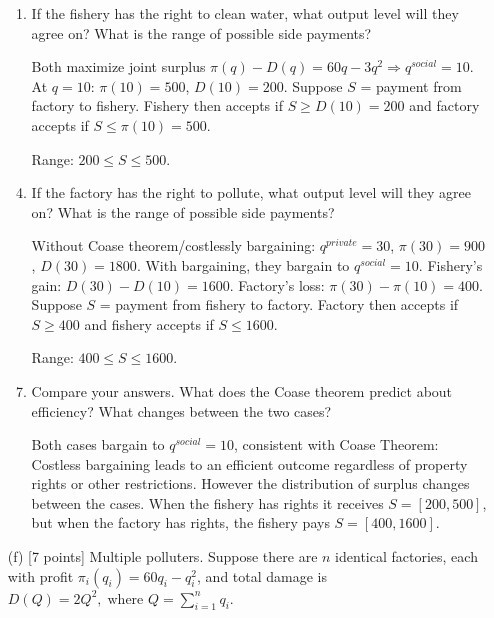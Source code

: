 \documentclass[11pt]{article}
\begin{document}
\begin{enumerate}[label=(\alph*)]
\begin{enumerate}[label=(\roman*)]
\item If the fishery has the right to clean water, what output level will they agree on? What is the range of possible side payments?
\item[] Both maximize joint surplus $\pi(q)-D(q)=60q-3q^2\Rightarrow q^{social}=10$. At $q=10$: $\pi(10)=500$, $D(10)=200$. Suppose $S$ = payment from factory to fishery. Fishery then accepts if $S\geq D(10)=200$ and factory accepts if $S\leq\pi(10)=500$. 
\item[] Range: $200\leq S\leq500$.
\item If the factory has the right to pollute, what output level will they agree on? What is the range of possible side payments?
\item[] Without Coase theorem/costlessly bargaining: $q^{private}=30$, $\pi(30)=900$, $D(30)=1800$. With bargaining, they bargain to $q^{social}=10$. Fishery's gain: $D(30)-D(10)=1600$. Factory's loss: $\pi(30)-\pi(10)=400$. Suppose $S$ = payment from fishery to factory. Factory then accepts if $S\geq400$ and fishery accepts if $S\leq1600$. 
\item[] Range: $400\leq S\leq1600$.
\item Compare your answers. What does the Coase theorem predict about efficiency? What changes between the two cases?
\item[] Both cases bargain to $q^{social}=10$, consistent with Coase Theorem: Costless bargaining leads to an efficient outcome regardless of property rights or other restrictions. However the distribution of surplus changes between the cases. When the fishery has rights it receives $S=[200,500]$, but when the factory has rights, the fishery pays $S=[400,1600]$.
\end{enumerate}

\item[ (f) ] [7 points] Multiple polluters. Suppose there are $n$ identical factories, each with profit $\pi_i(q_i) = 60q_i - q_i^2$, and total damage is $D(Q) = 2Q^2, \; \text{where } Q = \sum_{i=1}^n q_i$.


\end{enumerate}
\end{document}
